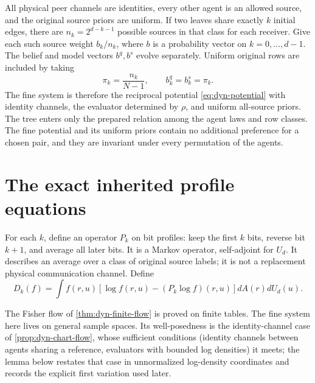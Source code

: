 All physical peer channels are identities, every other agent is an allowed source, and the original source priors are uniform. If two leaves share exactly $k$ initial edges, there are $n_k=2^{d-k-1}$ possible sources in that class for each receiver. Give each such source weight $b_k/n_k$, where $b$ is a probability vector on $k=0,\ldots,d-1$. The belief and model vectors $b^q,b^s$ evolve separately. Uniform original rows are included by taking
\begin{equation}
 \pi_k=\frac{n_k}{N-1},\qquad b_k^q=b_k^s=\pi_k.
 \label{eq:boundary-class-priors}
\end{equation}
The fine system is therefore the reciprocal potential \cref{eq:dyn-potential} with identity channels, the evaluator determined by $\rho$, and uniform all-source priors. The tree enters only the prepared relation among the agent laws and row classes. The fine potential and its uniform priors contain no additional preference for a chosen pair, and they are invariant under every permutation of the agents.

\section{The exact inherited profile equations}
\label{sec:boundary-profile-equations}

For each $k$, define an operator $P_k$ on bit profiles: keep the first $k$ bits, reverse bit $k+1$, and average all later bits. It is a Markov operator, self-adjoint for $U_d$. It describes an average over a class of original source labels; it is not a replacement physical communication channel. Define
\begin{equation}
 D_k(f)=\int f(r,u)[\log f(r,u)-(P_k\log f)(r,u)] dA(r) dU_d(u).
 \label{eq:boundary-class-cost}
\end{equation}

The Fisher flow of \cref{thm:dyn-finite-flow} is proved on finite tables. The fine system here lives on general sample spaces. Its well-posedness is the identity-channel case of \cref{prop:dyn-chart-flow}, whose sufficient conditions (identity channels between agents sharing a reference, evaluators with bounded log densities) it meets; the lemma below restates that case in unnormalized log-density coordinates and records the explicit first variation used later.

